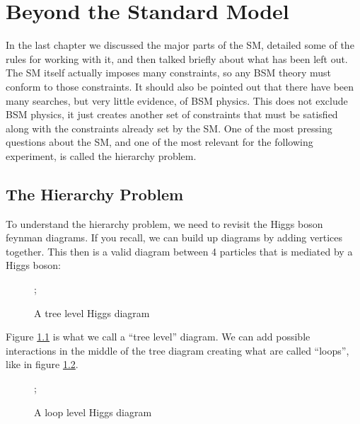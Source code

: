 \chapter{Beyond the Standard Model}
\label{chap:two}
In the last chapter we discussed the major parts of the SM, detailed some of the rules for working with it, and then talked briefly about what has been left out.
The SM itself actually imposes many constraints, so any BSM theory must conform to those constraints. It should also be pointed out that there have been many searches, but very little evidence, of BSM physics.
This does not exclude BSM physics, it just creates another set of constraints that must be satisfied along with the constraints already set by the SM. One of the most pressing questions about the SM, and one of the most relevant for the following experiment, is called the hierarchy problem.

\section{The Hierarchy Problem}

To understand the hierarchy problem, we need to revisit the Higgs boson feynman diagrams. If you recall, we can build up diagrams by adding vertices together. This then is a valid diagram between 4 particles that is mediated by a Higgs boson:
\begin{figure} %
    \centering
       ;
    \caption{A tree level Higgs diagram}
    \label{fig:fig_2-1}
 \end{figure}

Figure \ref{fig:fig_2-1} is what we call a ``tree level'' diagram. We can add possible interactions in the middle of the tree diagram creating what are called ``loops'', like in figure \ref{fig:fig_2-2}.

\begin{figure} %
    \centering
       ;
    \caption{A loop level Higgs diagram}
    \label{fig:fig_2-2}
 \end{figure}

